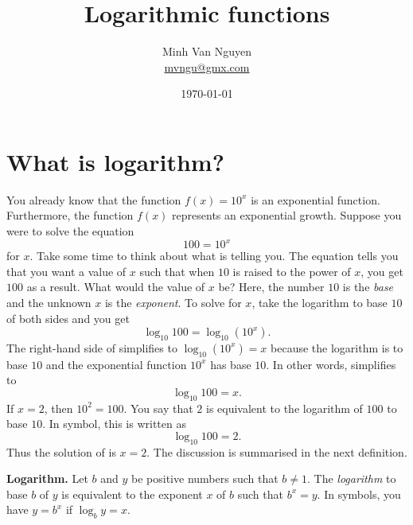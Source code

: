 \documentclass[a4paper,oneside,12pt]{article}
\begin{document}
\title{\Large\bf Logarithmic functions}
\author{%
  Minh Van Nguyen \\
  \url{mvngu@gmx.com}
}
\date{\today}
\maketitle



\section{What is logarithm?}

You already know that the function $f(x) = 10^x$ is an exponential
function.  Furthermore, the function $f(x)$ represents an exponential
growth.  Suppose you were to solve the equation
\begin{equation}
\label{eqn:exponential_growth_100_10_x}
100
=
10^x
\end{equation}
for $x$.  Take some time to think about what
 is telling you.  The
equation tells you that you want a value of $x$ such that when $10$ is
raised to the power of $x$, you get $100$ as a result.  What would the
value of $x$ be?  Here, the number $10$ is the \emph{base} and the
unknown $x$ is the \emph{exponent}.  To solve
 for $x$, take the logarithm
to base $10$ of both sides and you get
\begin{equation}
\label{eqn:log10_100}
\log_{10} 100
=
\log_{10} (10^x).
\end{equation}
The right-hand side of  simplifies to
$\log_{10} (10^x) = x$ because the logarithm is to base $10$ and the
exponential function $10^x$ has base $10$.  In other words,
 simplifies to
\[
\log_{10} 100
=
x.
\]
If $x = 2$, then $10^2 = 100$.  You say that $2$ is equivalent to the
logarithm of $100$ to base $10$.  In symbol, this is written as
\[
\log_{10}100
=
2.
\]
Thus the solution of  is
$x = 2$.  The discussion is summarised in the next definition.

\begin{definition}
\textbf{Logarithm.}
Let $b$ and $y$ be positive numbers such that $b \neq 1$.  The
\emph{logarithm} to base $b$ of $y$ is equivalent to the exponent $x$
of $b$ such that $b^x = y$.  In symbols, you have $y = b^x$ if
$\log_b y = x$.
\end{definition}
\end{document}
